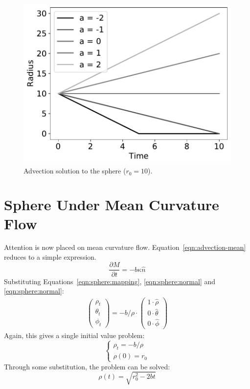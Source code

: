 \documentclass[journal]{IEEEtran}
\begin{document}
\begin{figure}[t]
  \centering
    \includegraphics[width=0.9\linewidth]{advection}%
  \caption{Advection solution to the sphere ($r_0 = 10$).}
  \label{fig:advection}
\end{figure}

\section{Sphere Under Mean Curvature Flow}
\label{sec:meanflow}
Attention is now placed on mean curvature flow.
Equation~\ref{eqn:advection-mean} reduces to a simple expression.
\begin{equation}
  \label{eqn:mean}
  \frac{\partial M}{\partial t} = -b \kappa \hat{n}
\end{equation}
Substituting Equations~\ref{eqn:sphere:mapping}, \ref{eqn:sphere:normal} and \ref{eqn:sphere:normal}:
\begin{align}
  \begin{pmatrix}
    \rho_t \\
    \theta_t \\
    \phi_t
  \end{pmatrix} = -b / \rho \cdot
  \begin{pmatrix}
    1 \cdot \hat{\rho} \\
    0 \cdot \hat{\theta} \\
    0 \cdot \hat{\phi}
  \end{pmatrix}
\end{align}
Again, this gives a single initial value problem:
\begin{equation}
  \left\{
    \begin{array}{ll}
      \rho_t = -b/\rho\\
      \rho(0) = r_0
    \end{array}
  \right.
\end{equation}
Through some substitution, the problem can be solved:
\begin{equation}
  \label{eqn:mean:solution}
  \rho(t) = \sqrt{r_0^2 - 2bt}
\end{equation}
\end{document}
